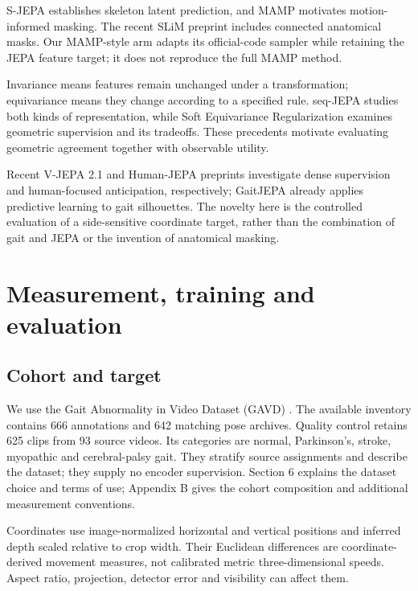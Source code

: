 \documentclass{article}
\begin{document}
S-JEPA \citep{ref05} establishes skeleton latent prediction, and MAMP \citep{ref06} motivates motion-informed masking. The recent SLiM preprint \citep{ref07} includes connected anatomical masks. Our MAMP-style arm adapts its official-code sampler while retaining the JEPA feature target; it does not reproduce the full MAMP method.

Invariance means features remain unchanged under a transformation; equivariance means they change according to a specified rule. seq-JEPA \citep{ref08} studies both kinds of representation, while Soft Equivariance Regularization \citep{ref09} examines geometric supervision and its tradeoffs. These precedents motivate evaluating geometric agreement together with observable utility.

Recent V-JEPA 2.1 \citep{ref10} and Human-JEPA \citep{ref11} preprints investigate dense supervision and human-focused anticipation, respectively; GaitJEPA \citep{ref12} already applies predictive learning to gait silhouettes. The novelty here is the controlled evaluation of a side-sensitive coordinate target, rather than the combination of gait and JEPA or the invention of anatomical masking.

\section{Measurement, training and evaluation}\label{measurement-training-and-evaluation}

\subsection{Cohort and target}\label{cohort-and-target}

We use the Gait Abnormality in Video Dataset (GAVD) \citep{ref13}. The available inventory contains 666 annotations and 642 matching pose archives. Quality control retains 625 clips from 93 source videos. Its categories are normal, Parkinson's, stroke, myopathic and cerebral-palsy gait. They stratify source assignments and describe the dataset; they supply no encoder supervision. Section 6 explains the dataset choice and terms of use; Appendix B gives the cohort composition and additional measurement conventions.

Coordinates use image-normalized horizontal and vertical positions and inferred depth scaled relative to crop width. Their Euclidean differences are coordinate-derived movement measures, not calibrated metric three-dimensional speeds. Aspect ratio, projection, detector error and visibility can affect them.
\end{document}
